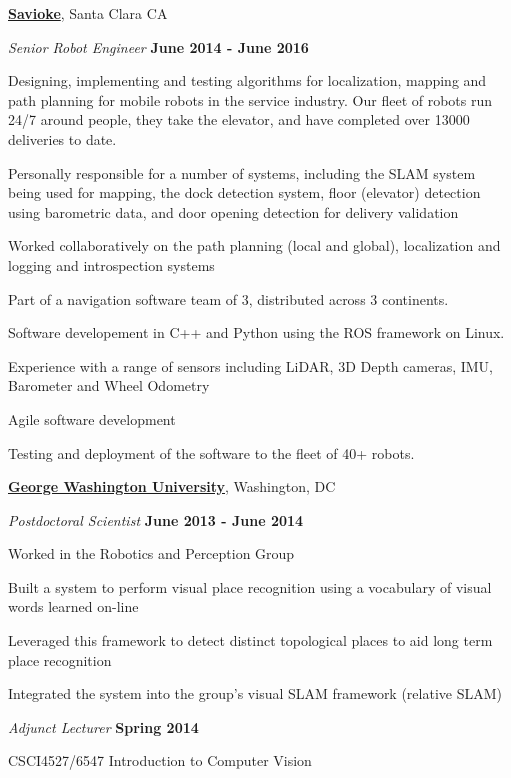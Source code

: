 \documentclass[10pt]{article}
\newenvironment{outerlist}[1][\enskip\textbullet]%
        {\begin{itemize}[#1]}{\end{itemize}%
         \vspace{-.6\baselineskip}}
\newenvironment{innerlist}[1][\enskip\textbullet]%
        {\begin{compactitem}[#1]}{\end{compactitem}}
\newcommand{\blankline}{\quad\pagebreak[2]}
\begin{document}
\href{http://www.savioke.com}{\textbf{Savioke}}, Santa Clara CA
\begin{outerlist}
\item[] \textit{Senior Robot Engineer} \hfill \textbf{June 2014 - June 2016}
\begin{innerlist}
\item Designing, implementing and testing algorithms for localization, mapping and path planning for mobile robots in
the service industry. Our fleet of robots run 24/7 around people, they take the elevator, and have completed over 13000
deliveries to date. 
\item Personally responsible for a number of systems, including the SLAM system being used for mapping, the dock detection system, floor (elevator)
detection using barometric data, and door opening detection for delivery validation
\item Worked collaboratively on the path planning (local and global), localization and logging and introspection
systems
\item Part of a navigation software team of 3, distributed across 3 continents. 
\item Software developement in C++ and Python using the ROS framework on Linux. 
\item Experience with a range of sensors including LiDAR, 3D Depth cameras, IMU, Barometer and Wheel Odometry
\item Agile software development
\item Testing and deployment of the software to the fleet of 40+ robots.
\end{innerlist}
\end{outerlist}
\blankline

\href{http://www.gwu.edu}{\textbf{George Washington University}}, 
Washington, DC
\begin{outerlist}
\item[] \textit{Postdoctoral Scientist} \hfill \textbf{June 2013 - June 2014}
\begin{innerlist}
\item{Worked in the Robotics and Perception Group}
\item{Built a system to perform visual place recognition using a vocabulary of visual words learned on-line}
\item{Leveraged this framework to detect distinct topological places to aid long term place recognition}
\item{Integrated the system into the group's visual SLAM framework (relative SLAM)}
\end{innerlist}
\end{outerlist}
\begin{outerlist}
\item[] \textit{Adjunct Lecturer} \hfill \textbf{Spring 2014}
\begin{innerlist}
\item{CSCI4527/6547 Introduction to Computer Vision}
\end{innerlist}
\end{outerlist}
\blankline
\end{document}
